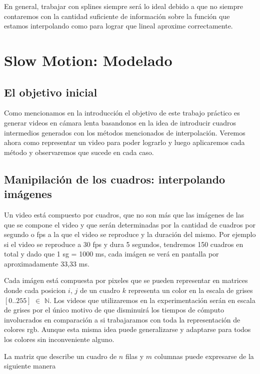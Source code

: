 En general, trabajar con splines siempre será lo ideal debido a que no siempre contaremos con la cantidad suficiente de información sobre la función que estamos interpolando como para lograr que lineal aproxime correctamente. 

\section{Slow Motion: Modelado}

\subsection{El objetivo inicial}

Como mencionamos en la introducción el objetivo de este trabajo práctico es generar videos en cámara lenta basandonos en la idea de introducir cuadros intermedios generados con los métodos mencionados de interpolación. Veremos ahora como representar un video para poder lograrlo y luego aplicaremos cada método y observaremos que sucede en cada caso.

\subsection{Manipilación de los cuadros: interpolando imágenes}

Un video está compuesto por cuadros, que no son más que las imágenes de las que se compone el video   y que serán determinadas por la cantidad de cuadros por segundo o fps a la que el video se reproduce y la duración del mismo.
Por ejemplo si el video se reproduce a 30 fps y dura 5 segundos, tendremos 150 cuadros en total y dado que 1 sg = 1000 ms, cada imágen se verá en pantalla por aproximadamente 33,33 ms.

Cada imágen está compuesta por pixeles que se pueden representar en matrices donde cada posicion $i$, $j$ de un cuadro $k$ representa un color en la escala de grises $[0..255]$ $\in$ $\mathbb{N}$. Los videos que utilizaremos en la experimentación serán en escala de grises por el único motivo de que disminuirá los tiempos de cómputo involucrados en comparación a si trabajaramos con toda la representación de colores rgb. Aunque esta misma idea puede generalizarse y adaptarse para todos los colores sin inconveniente alguno.

La matriz que describe un cuadro de $n$ filas y $m$ columnas puede expresarse de la siguiente manera

\vspace{4mm}

